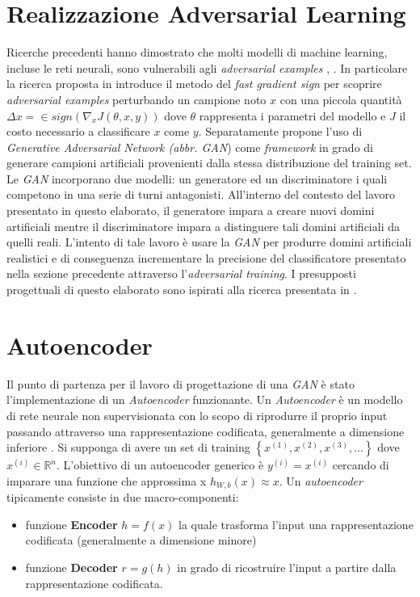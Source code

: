 \section{Realizzazione Adversarial Learning}
\label{adv}
Ricerche precedenti hanno dimostrato che molti modelli di machine learning, incluse le reti neurali, sono vulnerabili agli \textit{adversarial examples} \cite{1312.6199},  \cite{1412.6572}. In particolare la ricerca proposta in \cite{1412.6572} introduce il metodo del \textit{fast gradient sign} per scoprire \textit{adversarial examples} perturbando un campione noto $x$ con una piccola quantità $\Delta x =  \in sign(\nabla_x J(\theta,x,y))$ dove $\theta$ rappresenta i parametri del modello e $J$ il costo necessario a classificare $x$ come $y$.
Separatamente \cite{1406.2661} propone l'uso di \textit{Generative Adversarial Network (abbr. GAN})  come \textit{framework} in grado di generare campioni artificiali provenienti dalla stessa distribuzione del training set.
Le \textit{GAN} incorporano due modelli: un generatore ed un discriminatore i quali competono in una serie di turni antagonisti. All'interno del contesto del lavoro presentato in questo elaborato, il generatore impara a creare nuovi domini artificiali mentre il discriminatore impara a distinguere tali domini artificiali da quelli reali. L'intento di tale lavoro è usare la \textit{GAN} per produrre domini artificiali realistici e di conseguenza incrementare la precisione del classificatore presentato nella sezione precedente attraverso l'\textit{adversarial training}. I presupposti progettuali di questo elaborato sono ispirati alla ricerca presentata in \cite{deepdga}.

\section{Autoencoder}
\label{autoencoder}
Il punto di partenza per il lavoro di progettazione di una \textit{GAN} è stato l'implementazione di un \textit{Autoencoder} funzionante.  Un \textit{Autoencoder} è un modello di rete neurale non supervisionata con lo scopo di riprodurre il proprio input passando attraverso una rappresentazione codificata, generalmente a dimensione inferiore \cite{MAL-006} \cite{Liou:2008:MWP:1411851.1412074}. Si supponga di avere un set di training $\left\{ x^{(1)}, x^{(2)}, x^{(3)}, \ldots \right\}$ dove $x^{(i)} \in \mathbb{R}^n$. L'obiettivo di un autoencoder generico è $y^{(i)} = x^{(i)}$ cercando di imparare una funzione che approssima x $h_{W,b}(x) \approx x$. Un \textit{autoencoder} tipicamente consiste in due macro-componenti:
\begin{itemize}
\item funzione \textbf{Encoder} $h = f(x)$ la quale trasforma l'input una rappresentazione codificata (generalmente a dimensione minore)
\item funzione \textbf{Decoder} $r = g(h)$ in grado di ricostruire l'input a partire dalla rappresentazione codificata. 
\end{itemize}

